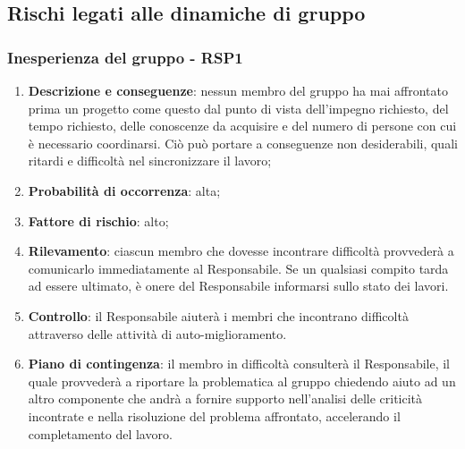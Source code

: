 \subsection{Rischi legati alle dinamiche di gruppo}
	\subsubsection{Inesperienza del gruppo - RSP1}	
	\begin{enumerate}
		\item \textbf{Descrizione e conseguenze}: nessun membro del gruppo ha mai affrontato prima un progetto come questo dal punto di vista dell'impegno richiesto, del tempo richiesto, delle conoscenze da acquisire e del numero di persone con cui è necessario coordinarsi. Ciò può portare a conseguenze non desiderabili, quali ritardi e difficoltà nel sincronizzare il lavoro;
		\item \textbf{Probabilità di occorrenza}: alta;
		\item \textbf{Fattore di rischio}: alto;
		\item \textbf{Rilevamento}: ciascun membro che dovesse incontrare difficoltà provvederà a comunicarlo immediatamente al Responsabile. Se un qualsiasi compito tarda ad essere ultimato, è onere del Responsabile informarsi sullo stato dei lavori. 
		\item \textbf{Controllo}: il Responsabile aiuterà i membri che incontrano difficoltà attraverso delle attività di auto-miglioramento.
		\item \textbf{Piano di contingenza}: il membro in difficoltà consulterà il Responsabile, il quale provvederà a riportare la problematica al gruppo chiedendo aiuto ad un altro componente che andrà a fornire supporto nell'analisi delle criticità incontrate e nella risoluzione del problema affrontato, accelerando il completamento del lavoro.
	\end{enumerate}
	
